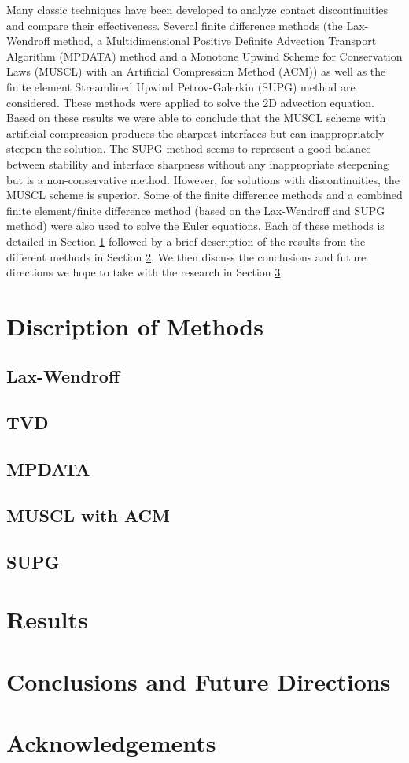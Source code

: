 \documentclass{article}
\begin{document}
Many classic techniques have been developed to analyze contact discontinuities and compare their effectiveness. Several finite difference methods (the Lax-Wendroff method, a Multidimensional Positive Definite Advection Transport Algorithm (MPDATA) method and a Monotone Upwind Scheme for Conservation Laws (MUSCL) with an Artificial Compression Method (ACM)) as well as the finite element Streamlined Upwind Petrov-Galerkin (SUPG) method are considered. These methods were applied to solve the 2D advection equation. Based on these results we were able to conclude that the MUSCL scheme with artificial compression produces the sharpest interfaces but can inappropriately steepen the solution. The SUPG method seems to represent a good balance between stability and interface sharpness without any inappropriate steepening but is a non-conservative method. However, for solutions with discontinuities, the MUSCL scheme is superior. Some of the finite difference methods and a combined finite element/finite difference method (based on the Lax-Wendroff and SUPG method) were also used to solve the Euler equations. Each of these methods is detailed in Section \ref{methods} followed by a brief description of the results from the different methods in Section \ref{results}. We then discuss the conclusions and future directions we hope to take with the research in Section \ref{conclusions}.

\section{Discription of Methods}
\label{methods}
\subsection{Lax-Wendroff}
\subsection{TVD}
\subsection{MPDATA}
\subsection{MUSCL with ACM}
\subsection{SUPG}

\section{Results}
\label{results}

\section{Conclusions and Future Directions}
\label{conclusions}

\section{Acknowledgements}



\end{document}
